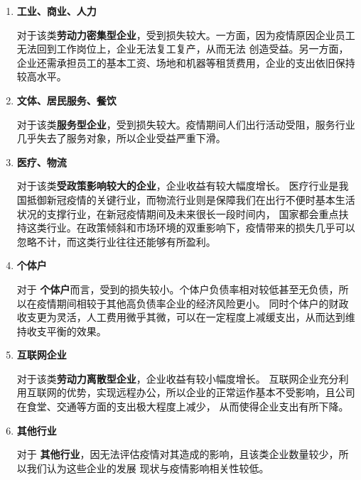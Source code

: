\documentclass[withoutpreface,bwprint]{cumcmthesis}
\begin{document}
        \begin{enumerate}
            \item \textbf{工业、商业、人力 } \par
                  对于该类\textbf{劳动力密集型企业}，受到损失较大。一方面，因为疫情原因企业员工无法回到工作岗位上，企业无法复工复产，从而无法
                  创造受益。另一方面，企业还需承担员工的基本工资、场地和机器等租赁费用，企业的支出依旧保持较高水平。
            \item \textbf{文体、居民服务、餐饮} \par
                  对于该类\textbf{服务型企业}，受到损失较大。疫情期间人们出行活动受阻，服务行业几乎失去了服务对象，所以企业受益严重下滑。
            \item \textbf{医疗、物流 } \par
                  对于该类\textbf{受政策影响较大的企业}，企业收益有较大幅度增长。
                  医疗行业是我国抵御新冠疫情的关键行业，而物流行业则是保障我们在出行不便时基本生活状况的支撑行业，在新冠疫情期间及未来很长一段时间内，
                  国家都会重点扶持这类行业。在政策倾斜和市场环境的双重影响下，疫情带来的损失几乎可以忽略不计，而这类行业往往还能够有所盈利。
            \item \textbf{个体户}\par
                  对于 \textbf{个体户}而言，受到的损失较小。个体户负债率相对较低甚至无负债，所以在疫情期间相较于其他高负债率企业的经济风险更小。
                  同时个体户的财政收支更为灵活，人工费用微乎其微，可以在一定程度上减缓支出，从而达到维持收支平衡的效果。
            \item \textbf{互联网企业}\par
                  对于该类\textbf{劳动力离散型企业}，企业收益有较小幅度增长。
                  互联网企业充分利用互联网的优势，实现远程办公，所以企业的正常运作基本不受影响，且公司在食堂、交通等方面的支出极大程度上减少，
                  从而使得企业支出有所下降。
            \item \textbf{其他行业}\par
                  对于 \textbf{其他行业}，因无法评估疫情对其造成的影响，且该类企业数量较少，所以我们认为这些企业的发展
                  现状与疫情影响相关性较低。
        \end{enumerate}
\end{document}

